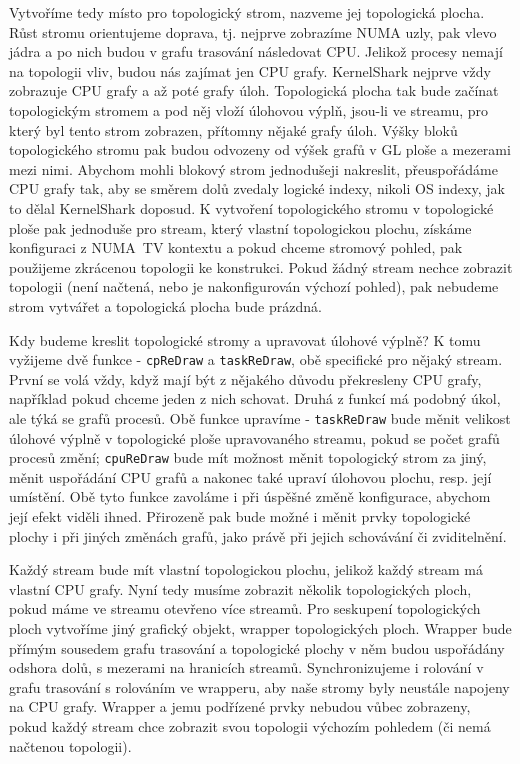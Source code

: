 Vytvoříme tedy místo pro topologický strom, nazveme jej topologická plocha. Růst stromu orientujeme doprava, tj. nejprve zobrazíme NUMA uzly, pak vlevo jádra a po nich budou v grafu trasování následovat CPU. Jelikož procesy nemají na topologii vliv, budou nás zajímat jen CPU grafy. KernelShark nejprve vždy zobrazuje CPU grafy a až poté grafy úloh. Topologická plocha tak bude začínat topologickým stromem a pod něj vloží úlohovou výplň, jsou-li ve streamu, pro který byl tento strom zobrazen, přítomny nějaké grafy úloh. Výšky bloků topologického stromu pak budou odvozeny od výšek grafů v GL ploše a mezerami mezi nimi. Abychom mohli blokový strom jednodušeji nakreslit, přeuspořádáme CPU grafy tak, aby se směrem dolů zvedaly logické indexy, nikoli OS indexy, jak to dělal KernelShark doposud. K vytvoření topologického stromu v topologické ploše pak jednoduše pro stream, který vlastní topologickou plochu, získáme konfiguraci z NUMA~TV kontextu a pokud chceme stromový pohled, pak použijeme zkrácenou topologii ke konstrukci. Pokud žádný stream nechce zobrazit topologii (není načtená, nebo je nakonfigurován výchozí pohled), pak nebudeme strom vytvářet a topologická plocha bude prázdná.

Kdy budeme kreslit topologické stromy a upravovat úlohové výplně? K tomu vyžijeme dvě  funkce - \texttt{cpReDraw} a \texttt{taskReDraw}, obě specifické pro nějaký stream. První se volá vždy, když mají být z nějakého důvodu překresleny CPU grafy, například pokud chceme jeden z nich schovat. Druhá z funkcí má podobný úkol, ale týká se grafů procesů. Obě funkce upravíme - \texttt{taskReDraw} bude měnit velikost úlohové výplně v topologické ploše upravovaného streamu, pokud se počet grafů procesů změní; \texttt{cpuReDraw} bude mít možnost měnit topologický strom za jiný, měnit uspořádání CPU grafů a nakonec také upraví úlohovou plochu, resp. její umístění. Obě tyto funkce zavoláme i při úspěšné změně konfigurace, abychom její efekt viděli ihned. Přirozeně pak bude možné i měnit prvky topologické plochy i při jiných změnách grafů, jako právě při jejich schovávání či zviditelnění.

Každý stream bude mít vlastní topologickou plochu, jelikož každý stream má vlastní CPU grafy. Nyní tedy musíme zobrazit několik topologických ploch, pokud máme ve streamu otevřeno více streamů. Pro seskupení topologických ploch vytvoříme jiný grafický objekt, wrapper topologických ploch. Wrapper bude přímým sousedem grafu trasování a topologické plochy v něm budou uspořádány odshora dolů, s mezerami na hranicích streamů. Synchronizujeme i rolování v grafu trasování s rolováním ve wrapperu, aby naše stromy byly neustále napojeny na CPU grafy. Wrapper a jemu podřízené prvky nebudou vůbec zobrazeny, pokud každý stream chce zobrazit svou topologii výchozím pohledem (či nemá načtenou topologii).

